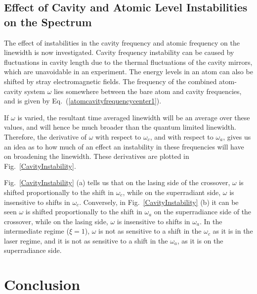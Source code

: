 \documentclass[aps,
twocolumn,
superscriptaddress,groupedaddress]{revtex4}
\begin{document}
\subsection{Effect of Cavity and Atomic Level Instabilities on the
Spectrum}

The effect of instabilities in the cavity frequency and atomic frequency
on the linewidth is now investigated. Cavity frequency instability can
be caused by fluctuations in cavity length due to the thermal
fluctuations of the cavity mirrors, which are unavoidable in an
experiment. The energy levels in an atom can also be shifted by stray
electromagnetic fields. The frequency of the combined atom-cavity system
$\omega$ lies somewhere between the bare atom and cavity frequencies,
and is given by Eq.~(\ref{atomcavityfrequencycenter1}).

If $\omega$ is varied, the resultant time averaged linewidth will be an
average over these values, and will hence be much broader than the
quantum limited linewidth. Therefore, the derivative of  $\omega$ with
respect to $\omega_c$, and with respect to $\omega_a$, gives us an idea
as to how much of an effect an instability in these frequencies will
have on broadening the linewidth. These derivatives are plotted in
Fig.~\ref{CavityInstability}.

Fig.~\ref{CavityInstability} (a) tells us that on the lasing side of the
crossover, $\omega$ is shifted proportionally to the shift in
$\omega_c$, while on the superradiant side, $\omega$ is insensitive to
shifts in $\omega_c$.  Conversely, in Fig.~\ref{CavityInstability} (b)
it can be seen $\omega$ is shifted proportionally to the shift in
$\omega_a$ on the superradiance side of the crossover, while on the
lasing side, $\omega$ is insensitive to shifts in $\omega_a$. In the
intermediate regime ($\xi=1$), $\omega$ is not as sensitive to a shift
in the $\omega_c$ as it is in the laser regime, and it is not as
sensitive to a shift in the $\omega_a$, as it is on the superradiance
side.

\section{Conclusion}
\end{document}

